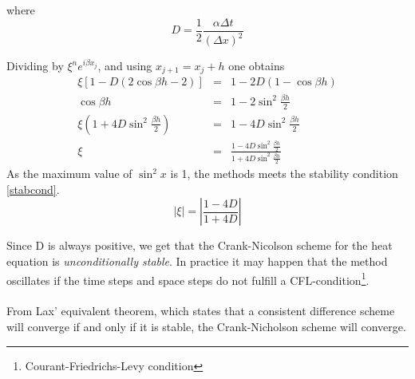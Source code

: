 where
\begin{equation*}
D = \frac{1}{2}\frac{\alpha\Delta t}{(\Delta x)^2}
\label{eq:crank-D}
\end{equation*}

Dividing  by $\xi^ne^{i\beta x_j}$, and using $x_{j+1} = x_j + h$ one obtains    %
\begin{eqnarray*}
\xi\left[1-D\left(2\cos{\beta h} - 2\right)\right] &=& 1 - 2D\left(1-\cos{\beta h}\right) \\
\cos{\beta h} &=& 1-2\sin^2{\frac{\beta h}{2}} \\
\xi\left(1+4D\sin^{2}{\frac{\beta h}{2}}\right) &=& 1 - 4D\sin^2{\frac{\beta h}{2}} \\
\xi &=& \frac{1-4D\sin^2{\frac{\beta h}{2}}}{1+4D\sin^2{\frac{\beta h}{2}}}
\end{eqnarray*}
As the maximum value of $\sin^2{x}$ is 1, the methods meets the stability condition \ref{stabcond}.
\begin{equation}
|\xi | = \left|\frac{1-4D}{1+4D}\right|
\end{equation}

Since D is always positive, we get that the Crank-Nicolson
scheme for the heat equation is \emph{unconditionally stable}. In practice it
may happen that the method oscillates if the time steps and space steps do not
fulfill a CFL-condition\footnote{Courant-Friedrichs-Levy condition}.
\\
\\
From Lax' equivalent theorem, which states that a consistent difference scheme will converge if and only if it is stable, the Crank-Nicholson scheme will converge.




